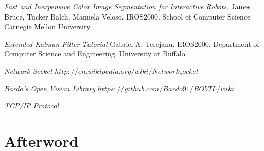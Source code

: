 \documentclass{book} %
\begin{document}
\listoffigures

\begin{thebibliography}{9}
 \textit{Fast and Inexpensive Color Image Segmentation for Interactive Robots.} James Bruce, Tucker Balch, Manuela Veloso. IROS2000. School of Computer Science Carnegie Mellon University

 \textit{Extended Kalman Filter Tutorial} Gabriel A. Terejanu. IROS2000. Department of Computer Science and Engineering, University at Buffalo

 \textit{Network Socket} $http://en.wikipedia.org/wiki/Network_socket$

 \textit{Bardo's Open Vision Library} $https://github.com/Bardo91/BOVIL/wiki$

 \textit{TCP/IP Protocol} 

\end{thebibliography}

\backmatter

\chapter{Afterword}
\end{document}
